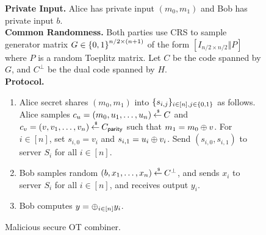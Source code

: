 \begin{figure}[!hp]
\begin{boxedalgo}
{\bfseries Private Input.} Alice has private input $(m_0,m_1)$ and Bob has private input $b$.\\

{\bfseries Common Randomness.} Both parties use CRS to sample generator matrix $G \in {\{0,1\}}^{n/2 \times (n+1)}$ of the form $[I_{n/2\times n/2}\Vert P]$ where $P$ is a random Toeplitz matrix.
Let $C$ be the code spanned by $G$, and $C^\perp$ be the dual code spanned by $H$.\\

{\bfseries Protocol.}
\begin{enumerate}
	\item Alice secret shares $(m_0, m_1)$ into $\{s_{i,j}\}_{i \in [n],j \in {\{0,1\}}}$ as follows.
	Alice samples $c_u = (m_0,u_1,\dotsc, u_n) \mathbin{\stackrel{\mbox{\,\tiny \$}}{\gets}} C$ and $c_v = (v, v_1, \dotsc, v_n) \mathbin{\stackrel{\mbox{\,\tiny \$}}{\gets}} C_\mathsf{parity}$ such that $m_1 = m_0 \oplus v$.
	For $ i\in [n]$, set $s_{i,0} = v_i$ and $s_{i,1} = u_i \oplus v_i$.
	Send $(s_{i,0}, s_{i,1})$ to server $S_i$ for all $i \in[n]$.
	
	\item Bob samples random $(b, x_1,\dotsc, x_n) \mathbin{\stackrel{\mbox{\,\tiny \$}}{\gets}} C^\perp$, and sends $x_i$ to server $S_i$ for all $i \in [n]$, and receives output $y_i$.
	
	\item Bob computes $y = \oplus_{i \in [n]} y_i$.
\end{enumerate}
	
\end{boxedalgo}
\label{fig:combiner}
\caption{Malicious secure OT combiner.}
\end{figure}